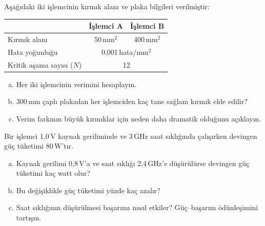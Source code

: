 \begin{alistirma}[\orta]
Aşağıdaki iki işlemcinin kırmık alanı ve plaka bilgileri verilmiştir:

\smallskip
\begin{tabular}{@{}lcc@{}}
\toprule
 & \textbf{İşlemci A} & \textbf{İşlemci B} \\
\midrule
Kırmık alanı & 50\,mm$^2$ & 400\,mm$^2$ \\
Hata yoğunluğu & \multicolumn{2}{c}{0{,}001\,hata/mm$^2$} \\
Kritik aşama sayısı ($N$) & \multicolumn{2}{c}{12} \\
\bottomrule
\end{tabular}
\smallskip

\begin{enumerate}[(a)]
    \item Her iki işlemcinin verimini hesaplayın.
    \item 300\,mm çaplı plakadan her işlemciden kaç tane sağlam kırmık elde edilir?
    \item Verim farkının büyük kırmıklar için neden daha dramatik olduğunu açıklayın.
\end{enumerate}
\end{alistirma}


\begin{alistirma}[\orta]
Bir işlemci 1{,}0\,V kaynak geriliminde ve 3\,GHz saat sıklığında çalışırken devingen güç tüketimi 80\,W'tır.
\begin{enumerate}[(a)]
    \item Kaynak gerilimi 0{,}8\,V'a ve saat sıklığı 2{,}4\,GHz'e düşürülürse devingen güç tüketimi kaç watt olur?
    \item Bu değişiklikle güç tüketimi yüzde kaç azalır?
    \item Saat sıklığının düşürülmesi başarımı nasıl etkiler? Güç--başarım ödünleşimini tartışın.
\end{enumerate}
\end{alistirma}

